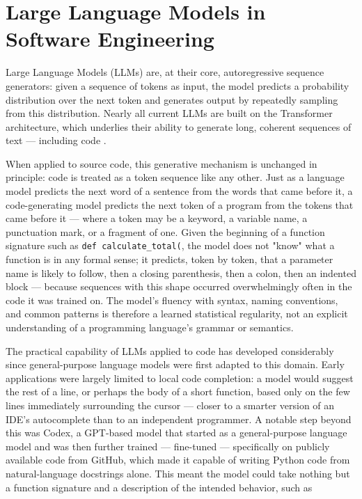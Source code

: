 \section{Large Language Models in Software Engineering}

Large Language Models (LLMs) are, at their core, autoregressive sequence generators: given a sequence of tokens as input, the model predicts a probability distribution over the next token and generates output by repeatedly sampling from this distribution. Nearly all current LLMs are built on the Transformer architecture, which underlies their ability to generate long, coherent sequences of text --- including code \cite{vaswani2017attention}.

When applied to source code, this generative mechanism is unchanged in principle: code is treated as a token sequence like any other. Just as a language model predicts the next word of a sentence from the words that came before it, a code-generating model predicts the next token of a program from the tokens that came before it --- where a token may be a keyword, a variable name, a punctuation mark, or a fragment of one. Given the beginning of a function signature such as \lstinline[style=inlinecode]{def calculate_total(}, the model does not "know" what a function is in any formal sense; it predicts, token by token, that a parameter name is likely to follow, then a closing parenthesis, then a colon, then an indented block --- because sequences with this shape occurred overwhelmingly often in the code it was trained on. The model's fluency with syntax, naming conventions, and common patterns is therefore a learned statistical regularity, not an explicit understanding of a programming language's grammar or semantics.

The practical capability of LLMs applied to code has developed considerably since general-purpose language models were first adapted to this domain. Early applications were largely limited to local code completion: a model would suggest the rest of a line, or perhaps the body of a short function, based only on the few lines immediately surrounding the cursor --- closer to a smarter version of an IDE's autocomplete than to an independent programmer. A notable step beyond this was Codex, a GPT-based model that started as a general-purpose language model and was then further trained --- fine-tuned --- specifically on publicly available code from GitHub, which made it capable of writing Python code from natural-language docstrings alone. This meant the model could take nothing but a function signature and a description of the intended behavior, such as

